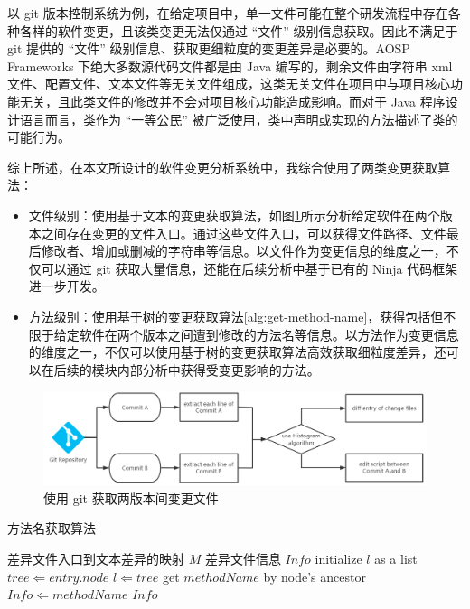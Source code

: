 以 git 版本控制系统为例，在给定项目中，单一文件可能在整个研发流程中存在各种各样的软件变更，且该类变更无法仅通过 “文件” 级别信息获取。因此不满足于 git 提供的 “文件” 级别信息、获取更细粒度的变更差异是必要的。AOSP Frameworks 下绝大多数源代码文件都是由 Java 编写的，剩余文件由字符串 xml 文件、配置文件、文本文件等无关文件组成，这类无关文件在项目中与项目核心功能无关，且此类文件的修改并不会对项目核心功能造成影响。而对于 Java 程序设计语言而言，类作为 “一等公民” 被广泛使用，类中声明或实现的方法描述了类的可能行为。

综上所述，在本文所设计的软件变更分析系统中，我综合使用了两类变更获取算法：

\begin{itemize}
    \item 文件级别：使用基于文本的变更获取算法，如图\ref{fig:git-alg}所示分析给定软件在两个版本之间存在变更的文件入口。通过这些文件入口，可以获得文件路径、文件最后修改者、增加或删减的字符串等信息。以文件作为变更信息的维度之一，不仅可以通过 git 获取大量信息，还能在后续分析中基于已有的 Ninja 代码框架进一步开发。
    \item 方法级别：使用基于树的变更获取算法\ref{alg:get-method-name}，获得包括但不限于给定软件在两个版本之间遭到修改的方法名等信息。以方法作为变更信息的维度之一，不仅可以使用基于树的变更获取算法高效获取细粒度差异，还可以在后续的模块内部分析中获得受变更影响的方法。

\end{itemize}

\begin{figure}
    \centering
    \includegraphics[width=.8\textwidth]{figures/git-alg.png}
    \caption{使用 git 获取两版本间变更文件}
    \label{fig:git-alg}
\end{figure}

\vskip 13.8pt
\renewcommand{\thealgorithm}{1}
    \begin{algorithm}
        \caption{方法名获取算法}
        \begin{algorithmic}[1]
            \Require 差异文件入口到文本差异的映射 $M$
            \Ensure 差异文件信息 $Info$
            \State initialize $l$ as a list
                \State $tree \Leftarrow entry.node$
                    \State $l \Leftarrow tree$
                \EndIf
            \EndFor
                \State get $methodName$ by node's ancestor
                \State $Info \Leftarrow methodName$
            \EndFor
            \State \Return $Info$
        \end{algorithmic}
        \label{alg:get-method-name}
    \end{algorithm}
    \vskip 13.8pt


